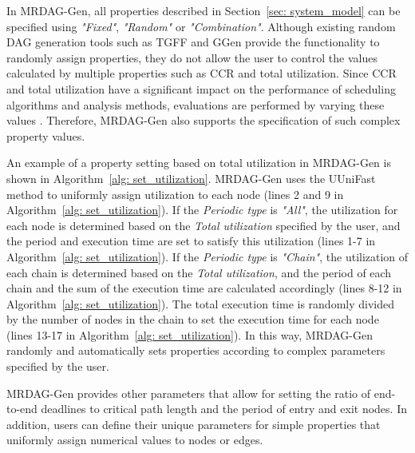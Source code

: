 In MRDAG-Gen, all properties described in Section~\ref{sec: system_model} can be specified using {\it "Fixed"}, {\it "Random"} or {\it "Combination"}.
Although existing random DAG generation tools such as TGFF and GGen provide the functionality to randomly assign properties, they do not allow the user to control the values calculated by multiple properties such as CCR and total utilization.
Since CCR and total utilization have a significant impact on the performance of scheduling algorithms and analysis methods, evaluations are performed by varying these values \cite{he2021response, agrawal2020hard, senapati2021hmds, sulaiman2021hybrid}.
Therefore, MRDAG-Gen also supports the specification of such complex property values.

An example of a property setting based on total utilization in MRDAG-Gen is shown in Algorithm~\ref{alg: set_utilization}.
MRDAG-Gen uses the UUniFast method \cite{bini2005measuring} to uniformly assign utilization to each node (lines 2 and 9 in Algorithm~\ref{alg: set_utilization}).
If the {\it Periodic type} is {\it "All"}, the utilization for each node is determined based on the {\it Total utilization} specified by the user, and the period and execution time are set to satisfy this utilization (lines 1-7 in Algorithm~\ref{alg: set_utilization}).
If the {\it Periodic type} is {\it "Chain"}, the utilization of each chain is determined based on the {\it Total utilization}, and the period of each chain and the sum of the execution time are calculated accordingly (lines 8-12 in Algorithm~\ref{alg: set_utilization}).
The total execution time is randomly divided by the number of nodes in the chain to set the execution time for each node (lines 13-17 in Algorithm~\ref{alg: set_utilization}).
In this way, MRDAG-Gen randomly and automatically sets properties according to complex parameters specified by the user.

MRDAG-Gen provides other parameters that allow for setting the ratio of end-to-end deadlines to critical path length and the period of entry and exit nodes.
In addition, users can define their unique parameters for simple properties that uniformly assign numerical values to nodes or edges.
